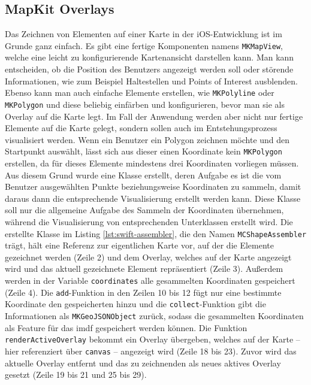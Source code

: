 \subsection{MapKit Overlays}
Das Zeichnen von Elementen auf einer Karte in der iOS-Entwicklung ist im Grunde ganz einfach.
Es gibt eine fertige Komponenten namens \texttt{MKMapView}, welche eine leicht zu konfigurierende Kartenansicht darstellen kann.
Man kann entscheiden, ob die Position des Benutzers angezeigt werden soll oder störende Informationen, wie zum Beispiel Haltestellen und Points of Interest ausblenden.
Ebenso kann man auch einfache Elemente erstellen, wie \texttt{MKPolyline} oder \texttt{MKPolygon} und diese beliebig einfärben und konfigurieren, bevor man sie als Overlay auf die Karte legt.
Im Fall der Anwendung werden aber nicht nur fertige Elemente auf die Karte gelegt, sondern sollen auch im Entstehungsprozess visualisiert werden.
Wenn ein Benutzer ein Polygon zeichnen möchte und den Startpunkt auswählt, lässt sich aus dieser einen Koordinate kein \texttt{MKPolygon} erstellen, da für dieses Elemente mindestens drei Koordinaten vorliegen müssen.\pbreak%
%
Aus diesem Grund wurde eine Klasse erstellt, deren Aufgabe es ist die vom Benutzer ausgewählten Punkte beziehungsweise Koordinaten zu sammeln, damit daraus dann die entsprechende Visualisierung erstellt werden kann.
Diese Klasse soll nur die allgemeine Aufgabe des Sammeln der Koordinaten übernehmen, während die Visualisierung von entsprechenden Unterklassen erstellt wird.
Die erstellte Klasse im Listing \ref{lst:swift-assembler}, die den Namen \texttt{MCShapeAssembler} trägt, hält eine Referenz zur eigentlichen Karte vor, auf der die Elemente gezeichnet werden (Zeile 2) und dem Overlay, welches auf der Karte angezeigt wird und das aktuell gezeichnete Element repräsentiert (Zeile 3).
Außerdem werden in der Variable \texttt{coordinates} alle gesammelten Koordinaten gespeichert (Zeile 4).
Die \texttt{add}-Funktion in den Zeilen 10 bis 12 fügt nur eine bestimmte Koordinate den gespeicherten hinzu und die \texttt{collect}-Funktion gibt die Informationen als \texttt{MKGeoJSONObject} zurück, sodass die gesammelten Koordinaten als Feature für das \acl{imdf} gespeichert werden können.
Die Funktion \texttt{renderActiveOverlay} bekommt ein Overlay übergeben, welches auf der Karte – hier referenziert über \texttt{canvas} – angezeigt wird (Zeile 18 bis 23).
Zuvor wird das aktuelle Overlay entfernt und das zu zeichnenden als neues aktives Overlay gesetzt (Zeile 19 bis 21 und 25 bis 29).
